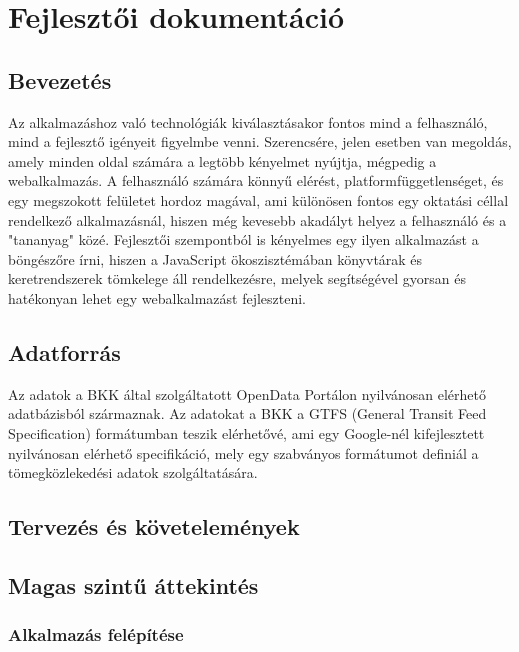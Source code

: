 \chapter{Fejlesztői dokumentáció}
\label{ch:dev}

\section{Bevezetés}

Az alkalmazáshoz való technológiák kiválasztásakor fontos mind a felhasználó, mind a fejlesztő igényeit figyelmbe venni. Szerencsére, jelen esetben van megoldás, amely minden oldal számára a legtöbb kényelmet nyújtja, mégpedig a webalkalmazás. A felhasználó számára könnyű elérést, platformfüggetlenséget, és egy megszokott felületet hordoz magával, ami különösen fontos egy oktatási céllal rendelkező alkalmazásnál, hiszen még kevesebb akadályt helyez a felhasználó és a "tananyag" közé. Fejlesztői szempontból is kényelmes egy ilyen alkalmazást a böngészőre írni, hiszen a JavaScript ökoszisztémában könyvtárak és keretrendszerek tömkelege áll rendelkezésre, melyek segítségével gyorsan és hatékonyan lehet egy webalkalmazást fejleszteni.

\section{Adatforrás}

Az adatok a BKK által szolgáltatott OpenData Portálon\cite{bkkopendata} nyilvánosan elérhető adatbázisból származnak. Az adatokat a BKK a GTFS (General Transit Feed Specification) formátumban teszik elérhetővé, ami egy Google-nél kifejlesztett\cite{gtfsabout} nyilvánosan elérhető specifikáció, mely egy szabványos formátumot definiál a tömegközlekedési adatok szolgáltatására.

\section{Tervezés és követelemények}

\section{Magas szintű áttekintés}

\subsection{Alkalmazás felépítése}


